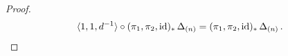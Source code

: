 \documentclass{amsart}
\numberwithin{equation}{section}
\begin{document}
\begin{proof}
\begin{equation}
\label{eqn_2025_07_02_1642}
\langle 1,1,d^{-1}\rangle \circ (\pi_1,\pi_2,{\rm id})_*\,\Delta_{(n)}=(\pi_1,\pi_2,{\rm id})_*\,\Delta_{(n)}\,. 
\end{equation}






\end{proof}
\end{document}

